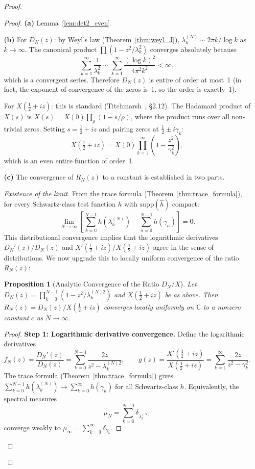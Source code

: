 \documentclass{pre-aomart}
\def\xi{X}%
\theoremstyle{plain}
\newtheorem{proposition}[theorem]{Proposition}
\theoremstyle{definition}
\theoremstyle{remark}
\begin{document}
\begin{proof}
\begin{proof}
\textbf{(a)} Lemma~\ref{lem:det2_even}.

\textbf{(b)} For $D_N(z)$: by Weyl's law (Theorem~\ref{thm:weyl_J}),
$\lambda_k^{(N)} \sim 2\pi k/\log k$ as $k \to \infty$.  The canonical product
$\prod(1 - z^2/\lambda_k^2)$ converges absolutely because
\[
\sum_{k=1}^\infty \frac{1}{\lambda_k^2}
  \sim \sum_{k=1}^\infty \frac{(\log k)^2}{4\pi^2 k^2} < \infty,
\]
which is a convergent series.  Therefore $D_N(z)$ is entire of order at most~1
(in fact, the exponent of convergence of the zeros is~1, so the order is
exactly~1).

For $\xi(\tfrac12+iz)$: this is standard (Titchmarsh~\cite{Titchmarsh1986}, \S2.12).
The Hadamard product of $\xi(s)$ is
$\xi(s) = \xi(0)\prod_\rho(1 - s/\rho)$, where the product runs over all
non-trivial zeros.  Setting $s = \tfrac12+iz$ and pairing zeros at
$\tfrac12 \pm i\gamma_k$:
\[
\xi\left(\tfrac12+iz\right) = \xi(0)\prod_{k=1}^\infty\left(1 - \frac{z^2}{\gamma_k^2}\right),
\]
which is an even entire function of order~1.

\textbf{(c)} The convergence of $R_N(z)$ to a constant is established in two parts.

\emph{Existence of the limit.} From the trace formula
(Theorem~\ref{thm:trace_formula}), for every Schwartz-class test function $h$
with $\mathrm{supp}(\widehat{h})$ compact:
\[
\lim_{N\to\infty}\left[\sum_{k=0}^{N-1}h\!\left(\lambda_k^{(N)}\right)
  - \sum_{n=0}^{N-1}h(\gamma_n)\right] = 0.
\]
This distributional convergence implies that the logarithmic derivatives
$D_N'(z)/D_N(z)$ and $\xi'(\tfrac12+iz)/\xi(\tfrac12+iz)$ agree in the
sense of distributions.  We now upgrade this to locally uniform convergence
of the ratio $R_N(z)$:

\begin{proposition}[Analytic Convergence of the Ratio $D_N/\xi$]\label{prop:ratio_conv}
Let $D_N(z) = \prod_{k=0}^{N-1}(1 - z^2/\lambda_k^{(N)2})$ and
$\xi(\tfrac12+iz)$ be as above.  Then $R_N(z) = D_N(z)/\xi(\tfrac12+iz)$
converges locally uniformly on $\mathbb{C}$ to a nonzero constant $c$ as
$N \to \infty$.
\end{proposition}

\begin{proof}
\textbf{Step 1: Logarithmic derivative convergence.}
Define the logarithmic derivatives
\[
f_N(z) = \frac{D_N'(z)}{D_N(z)} = \sum_{k=0}^{N-1} \frac{2z}{z^2 - \lambda_k^{(N)2}},
\qquad
g(z) = \frac{\xi'(\tfrac12+iz)}{\xi(\tfrac12+iz)}
  = \sum_{k=1}^\infty \frac{2z}{z^2 - \gamma_k^2}.
\]
The trace formula (Theorem~\ref{thm:trace_formula}) gives
$\sum_{k=0}^{N-1} h(\lambda_k^{(N)}) \to \sum_{k=0}^\infty h(\gamma_k)$
for all Schwartz-class $h$.  Equivalently, the spectral measures
\[
\mu_N = \sum_{k=0}^{N-1} \delta_{\lambda_k^{(N)}}
\]
converge weakly to $\mu_\infty = \sum_{k=0}^\infty \delta_{\gamma_k}$.


\end{proof}
\end{proof}
\end{proof}
\end{document}
